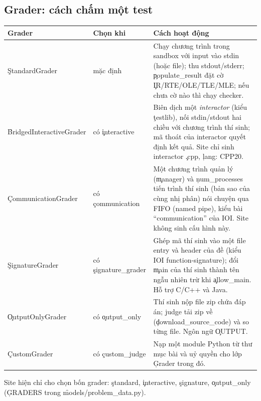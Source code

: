 \subsection{Grader: cách chấm một test}\label{sec:graders}
\begin{center}\small
\begin{tabularx}{\textwidth}{@{}L{3.7cm}L{3.0cm}Y@{}}
\toprule
Grader & Chọn khi & Cách hoạt động \\
\midrule
\c{StandardGrader} & mặc định & Chạy chương trình trong sandbox với input vào stdin (hoặc file); thu stdout/stderr; \c{populate_result} đặt cờ \c{IR/RTE/OLE/TLE/MLE}; nếu chưa cờ nào thì chạy checker. \\
\f{BridgedInteractiveGrader} & có \c{interactive} & Biên dịch một \emph{interactor} (kiểu \c{testlib}), nối stdin/stdout hai chiều với chương trình thí sinh; mã thoát của interactor quyết định kết quả. Site chỉ sinh interactor \c{.cpp}, \c{lang: CPP20}. \\
\c{CommunicationGrader} & có \c{communication} & Một chương trình quản lý (\c{manager}) và \c{num_processes} tiến trình thí sinh (bản sao của cùng nhị phân) nói chuyện qua FIFO (named pipe), kiểu bài ``communication'' của IOI. Site không sinh cấu hình này. \\
\c{SignatureGrader} & có \c{signature_grader} & Ghép mã thí sinh vào một file entry và header của đề (kiểu IOI function-signature); đổi \c{main} của thí sinh thành tên ngẫu nhiên trừ khi \c{allow_main}. Hỗ trợ C/C++ và Java. \\
\c{OutputOnlyGrader} & có \c{output_only} & Thí sinh nộp file zip chứa đáp án; judge tải zip về (\c{download_source_code}) và so từng file. Ngôn ngữ \c{OUTPUT}. \\
\c{CustomGrader} & có \c{custom_judge} & Nạp một module Python từ thư mục bài và uỷ quyền cho lớp \c{Grader} trong đó. \\
\bottomrule
\end{tabularx}
\end{center}
Site hiện chỉ cho chọn bốn grader: \c{standard}, \c{interactive}, \c{signature}, \c{output_only} (\c{GRADERS} trong \f{models/problem_data.py}). \tS

